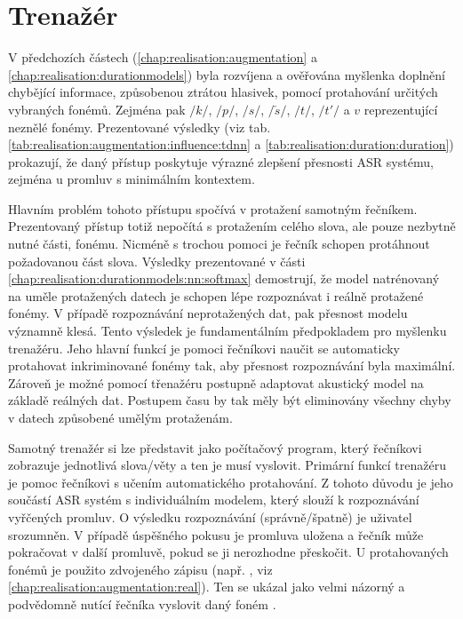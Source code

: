 \section{Trenažér}
\label{chap:realisation:trainer}

V předchozích částech (\ref{chap:realisation:augmentation} a \ref{chap:realisation:durationmodels}) byla rozvíjena a ověřována myšlenka doplnění chybějící informace, způsobenou ztrátou hlasivek, pomocí protahování určitých vybraných fonémů. Zejména pak $/k/$, $/p/$, $/s/$, $/\check{s}/$, $/t/$, $/t'/$ a $v$ reprezentující neznělé fonémy. Prezentované výsledky (viz tab. \ref{tab:realisation:augmentation:influence:tdnn} a \ref{tab:realisation:duration:duration}) prokazují, že daný přístup poskytuje výrazné zlepšení přesnosti ASR systému, zejména u promluv s minimálním kontextem.

Hlavním problém tohoto přístupu spočívá v protažení samotným řečníkem. Prezentovaný přístup totiž nepočítá s protažením celého slova, ale pouze nezbytně nutné části, fonému. Nicméně s trochou pomoci je řečník schopen protáhnout požadovanou část slova. Výsledky prezentované v části \ref{chap:realisation:durationmodels:nn:softmax} demostrují, že model natrénovaný na uměle protažených datech je schopen lépe rozpoznávat i reálně protažené fonémy. V případě rozpoznávání neprotažených dat, pak přesnost modelu významně klesá. Tento výsledek je fundamentálním předpokladem pro myšlenku trenažéru. Jeho hlavní funkcí je pomoci řečníkovi naučit se automaticky protahovat inkriminované fonémy tak, aby přesnost rozpoznávání byla maximální. Zároveň je možné pomocí třenažéru postupně adaptovat akustický model na základě reálných dat. Postupem času by tak měly být eliminovány všechny chyby v datech způsobené umělým protaženám.

Samotný trenažér si lze představit jako počítačový program, který řečníkovi zobrazuje jednotlivá slova/věty a ten je musí vyslovit. Primární funkcí trenažéru je pomoc řečníkovi s učením automatického protahování. Z tohoto důvodu je jeho součástí ASR systém s individuálním modelem, který slouží k rozpoznávání vyřčených promluv. O výsledku rozpoznávání (správně/špatně) je uživatel srozumněn. V případě úspěšného pokusu je promluva uložena a řečník může pokračovat v další promluvě, pokud se ji nerozhodne přeskočit. U protahovaných fonémů je použito zdvojeného zápisu (např. \textit{}, viz \ref{chap:realisation:augmentation:real}). Ten se ukázal jako velmi názorný a podvědomně nutící řečníka vyslovit daný foném .

